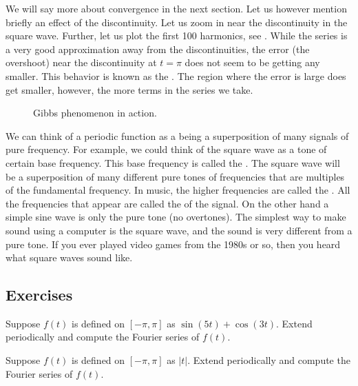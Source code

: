 \documentclass[12pt]{book}
\begin{document}
We will say more about convergence in the next section.  Let us however
mention briefly an effect of the discontinuity.  Let us zoom in near the
discontinuity in the square wave.  Further, let us plot the first 100
harmonics, see
.  While the
series is a very good approximation away from the discontinuities, the error
(the overshoot)
near the discontinuity at $t=\pi$ does not seem to be getting any smaller.
This behavior is known as the \emph{}.
The region where the error is large does get smaller, however, the more
terms in the series we take.

\begin{figure}[h!t]
\capstart
\begin{center}
\caption{Gibbs phenomenon in action.\label{ts:squarewavegibbsfig}}
\end{center}
\end{figure}

We can think of a periodic function as a  being a superposition of 
many signals of pure frequency.  For example, we could think of the square
wave as a tone of certain base frequency.
This base frequency is called the
\emph{}.
The square wave
will be
a superposition of
many different pure tones of frequencies that are multiples of the
fundamental frequency.
In music,
the higher frequencies are called the \emph{}.
All the frequencies that appear are called the
\emph{} of the signal.
On the other hand a simple sine wave is only the pure tone (no overtones).  The
simplest way to make sound using a computer is the square wave, and the sound
is very different from a pure tone.  If you ever played video games
from the 1980s or so, then you heard what square waves sound like.

\subsection{Exercises}

\begin{exercise}
Suppose $f(t)$ is defined on $[-\pi,\pi]$ as $\sin (5t) + \cos (3t)$.  Extend
periodically and compute the Fourier series of $f(t)$.
\end{exercise}

\begin{exercise}
Suppose $f(t)$ is defined on $[-\pi,\pi]$ as $\lvert t \rvert$.
Extend periodically and compute the Fourier series of $f(t)$.
\end{exercise}
\end{document}
